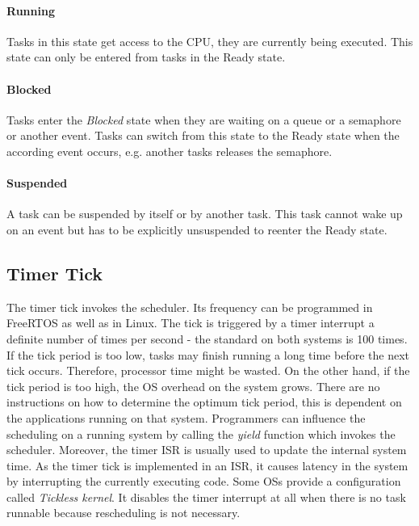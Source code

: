 \paragraph{Running}
Tasks in this state get access to the \ac{CPU}, they are currently being executed.
This state can only be entered from tasks in the Ready state.

\paragraph{Blocked}
Tasks enter the \textit{Blocked} state when they are waiting on a queue or a semaphore or another event.
Tasks can switch from this state to the Ready state when the according event occurs, e.g. another tasks releases the semaphore.

\paragraph{Suspended}
A task can be suspended by itself or by another task. 
This task cannot wake up on an event but has to be explicitly unsuspended to reenter the Ready state.  

\subsection{Timer Tick}\label{ss_timer_tick}
The timer tick invokes the scheduler.
Its frequency can be programmed in FreeRTOS as well as in Linux.
The tick is triggered by a timer interrupt a definite number of times per second - the standard on both systems is 100 times. 
If the tick period is too low, tasks may finish running a long time before the next tick occurs.
Therefore, processor time might be wasted.
On the other hand, if the tick period is too high, the \ac{OS} overhead on the system grows.
There are no instructions on how to determine the optimum tick period, this is dependent on the applications running on that system. 
Programmers can influence the scheduling on a running system by calling the \textit{yield} function which invokes the scheduler.
Moreover, the timer \ac{ISR} is usually used to update the internal system time. 
As the timer tick is implemented in an \ac{ISR}, it causes latency in the system by interrupting the currently executing code. 
Some \acp{OS} provide a configuration called \textit{Tickless kernel}.
It disables the timer interrupt at all when there is no task runnable because rescheduling is not necessary.
 
